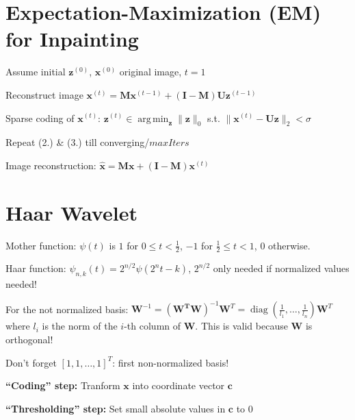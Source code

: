 \documentclass[a4paper, 11pt, landscape]{article}
\DeclareMathOperator*{\argmin}{arg\,min}
\begin{document}
\begin{multicols*}{3}
\section{Expectation-Maximization (EM) for Inpainting}
\begin{inparaenum}
	\item Assume initial $\mathbf{z}^{(0)}$, $\mathbf{x}^{(0)}$ original image, $t = 1$
	\item Reconstruct image $\mathbf{x}^{(t)} = \mathbf{M}\mathbf{x}^{(t-1)} + (\mathbf{I} - \mathbf{M})\mathbf{U}\mathbf{z}^{(t-1)}$
	\item Sparse coding of $\mathbf{x}^{(t)}$: $\mathbf{z}^{(t)} \in \argmin_{\mathbf{z}} \|\mathbf{z}\|_0$ s.t. $\|\mathbf{x}^{(t)} - \mathbf{Uz}\|_2 < \sigma$
	\item Repeat (2.) \& (3.) till converging/$\mathit{maxIters}$
	\item Image reconstruction: $\hat{\mathbf{x}} = \mathbf{Mx} + (\mathbf{I} - \mathbf{M})\mathbf{x}^{(t)}$
\end{inparaenum}


\section{Haar Wavelet}
\begin{compactdesc}
	\item[Mother function:] $\psi(t)$ is $1$ for $0 \leq t < \frac{1}{2}$, $-1$ for $\frac{1}{2} \leq t < 1$, $0$ otherwise.
	\item[Haar function:] $\psi_{n,k}(t) = 2^{n/2} \psi(2^n t - k)$, $2^{n/2}$ only needed if normalized values needed!
\end{compactdesc}

\begin{compactitem}
	\item For the not normalized basis: $\mathbf{W}^{-1} = (\mathbf{W^T} \mathbf{W})^{-1} \mathbf{W}^T = \operatorname{diag}(\frac{1}{l_1}, \ldots, \frac{1}{l_n}) \mathbf{W}^T$ where $l_i$ is the norm of the $i$-th column of $\mathbf{W}$. This is valid because $\mathbf{W}$ is orthogonal!
	\item Don't forget $[1, 1, \ldots, 1]^T$: first non-normalized basis!
	\item \textbf{``Coding'' step:} Tranform $\mathbf{x}$ into coordinate vector $\mathbf{c}$
	\item \textbf{``Thresholding'' step:} Set small absolute values in $\mathbf{c}$ to $0$
\end{compactitem}


\end{multicols*}
\end{document}
